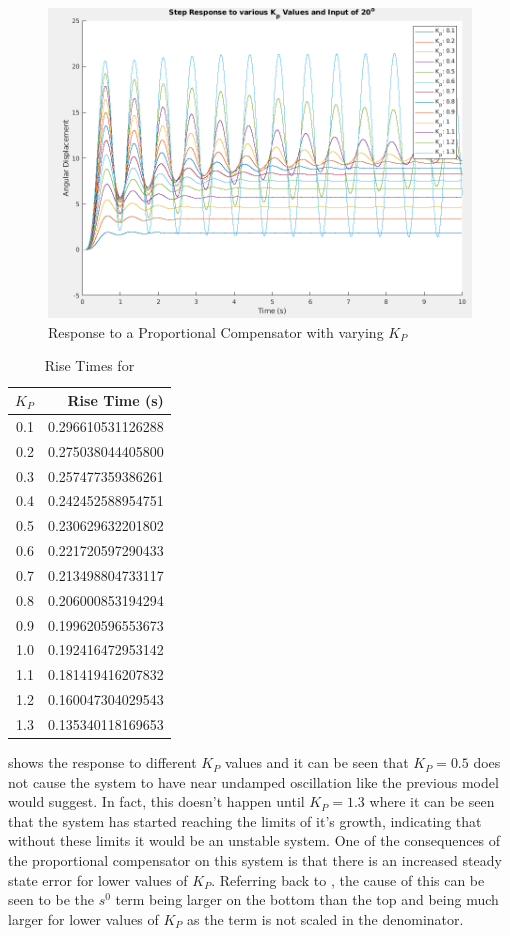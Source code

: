 \documentclass[a4paper, 11pt, compsoc]{IEEEtran}
\begin{document}
			\begin{figure}[!ht]
				\centering
				\includegraphics[width=\columnwidth]{lab5KP.png}
				\caption{Response to a Proportional Compensator with varying $K_P$}
				\label{fig:lab5KP}
			\end{figure}
			\begin{table}
				\label{tab:lab5KPRT}
				\centering
				\begin{tabular}{r|r}
					$K_P$ & Rise Time (s)\\
					\hline
					0.1 & 0.296610531126288\\
					0.2 & 0.275038044405800\\
					0.3 & 0.257477359386261\\
					0.4 & 0.242452588954751\\
					0.5 & 0.230629632201802\\
					0.6 & 0.221720597290433\\
					0.7 & 0.213498804733117\\
					0.8 & 0.206000853194294\\
					0.9 & 0.199620596553673\\
					1.0 & 0.192416472953142\\
					1.1 & 0.181419416207832\\
					1.2 & 0.160047304029543\\
					1.3 & 0.135340118169653\\
				\end{tabular}
				\caption{Rise Times for }
			\end{table}
			 shows the response to different $K_P$ values and it can be seen that $K_P = 0.5$ does not cause the system to have near undamped oscillation like the previous model would suggest. In fact, this doesn't happen until $K_P = 1.3$ where it can be seen that the system has started reaching the limits of it's growth, indicating that without these limits it would be an unstable system. One of the consequences of the proportional compensator on this system is that there is an increased steady state error for lower values of $K_P$. Referring back to , the cause of this can be seen to be the $s^0$ term being larger on the bottom than the top and being much larger for lower values of $K_P$ as the term is not scaled in the denominator.
\end{document}
